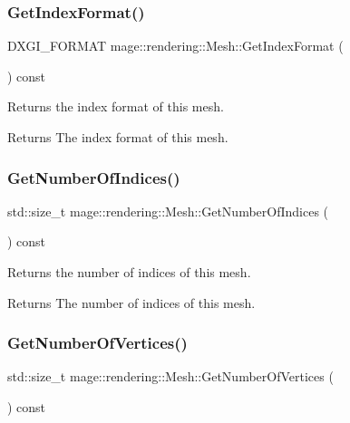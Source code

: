 \subsubsection{\texorpdfstring{Get\+Index\+Format()}{GetIndexFormat()}}
{\footnotesize\ttfamily D\+X\+G\+I\+\_\+\+F\+O\+R\+M\+AT mage\+::rendering\+::\+Mesh\+::\+Get\+Index\+Format (\begin{DoxyParamCaption}{ }\end{DoxyParamCaption}) const\hspace{0.3cm}{\ttfamily [noexcept]}}

Returns the index format of this mesh.

\begin{DoxyReturn}{Returns}
The index format of this mesh. 
\end{DoxyReturn}
\mbox{\label{classmage_1_1rendering_1_1_mesh_a82820c8395d4298fdc90bbe60332760a}} 
\subsubsection{\texorpdfstring{Get\+Number\+Of\+Indices()}{GetNumberOfIndices()}}
{\footnotesize\ttfamily std\+::size\+\_\+t mage\+::rendering\+::\+Mesh\+::\+Get\+Number\+Of\+Indices (\begin{DoxyParamCaption}{ }\end{DoxyParamCaption}) const\hspace{0.3cm}{\ttfamily [noexcept]}}

Returns the number of indices of this mesh.

\begin{DoxyReturn}{Returns}
The number of indices of this mesh. 
\end{DoxyReturn}
\mbox{\label{classmage_1_1rendering_1_1_mesh_a92d3e120584e8032c54d3040b1333c51}} 
\subsubsection{\texorpdfstring{Get\+Number\+Of\+Vertices()}{GetNumberOfVertices()}}
{\footnotesize\ttfamily std\+::size\+\_\+t mage\+::rendering\+::\+Mesh\+::\+Get\+Number\+Of\+Vertices (\begin{DoxyParamCaption}{ }\end{DoxyParamCaption}) const\hspace{0.3cm}{\ttfamily [noexcept]}}

